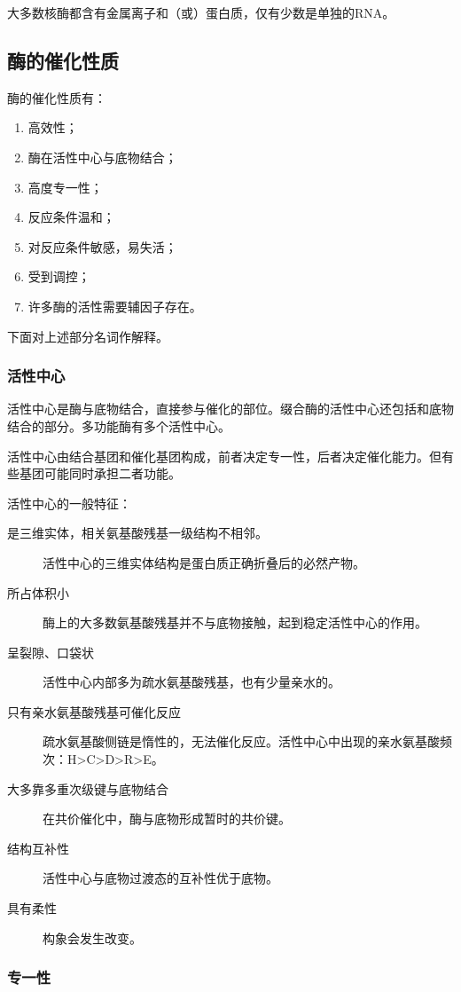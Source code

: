 大多数核酶都含有金属离子和（或）蛋白质，仅有少数是单独的RNA。

\subsection{酶的催化性质}

酶的催化性质有：
\begin{enumerate}
	\item 高效性；
	\item 酶在活性中心与底物结合；
	\item 高度专一性；
	\item 反应条件温和；
	\item 对反应条件敏感，易失活；
	\item 受到调控；
	\item 许多酶的活性需要辅因子存在。
\end{enumerate}

下面对上述部分名词作解释。

\subsubsection{活性中心}

活性中心是酶与底物结合，直接参与催化的部位。缀合酶的活性中心还包括和底物结合的部分。多功能酶有多个活性中心。

活性中心由结合基团和催化基团构成，前者决定专一性，后者决定催化能力。但有些基团可能同时承担二者功能。

活性中心的一般特征：
\begin{description}
	\item[是三维实体，相关氨基酸残基一级结构不相邻。] 活性中心的三维实体结构是蛋白质正确折叠后的必然产物。
	\item[所占体积小] 酶上的大多数氨基酸残基并不与底物接触，起到稳定活性中心的作用。
	\item[呈裂隙、口袋状] 活性中心内部多为疏水氨基酸残基，也有少量亲水的。
	\item[只有亲水氨基酸残基可催化反应] 疏水氨基酸侧链是惰性的，无法催化反应。活性中心中出现的亲水氨基酸频次：H>C>D>R>E。
	\item[大多靠多重次级键与底物结合] 在共价催化中，酶与底物形成暂时的共价键。
	\item[结构互补性] 活性中心与底物过渡态的互补性优于底物。
	\item[具有柔性] 构象会发生改变。
\end{description}

\subsubsection{专一性}

